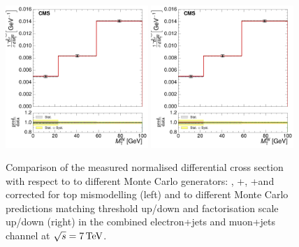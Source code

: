 \begin{figure}[hbtp]
    \centering
     \includegraphics[width=0.48\textwidth]{Chapters/04_Analysis/04b_XSections/images/results/7TeV/MT/central/normalised_xsection_combined_different_generators.pdf}\hfill
     \includegraphics[width=0.48\textwidth]{Chapters/04_Analysis/04b_XSections/images/results/7TeV/MT/central/normalised_xsection_combined_systematics_shifts.pdf}\hfill
     \caption{Comparison of the measured normalised differential cross section with respect to \mt to
     different Monte Carlo generators: \MADGRAPH, \POWHEG+\HERWIG, \POWHEG+\PYTHIA and \MADGRAPH corrected for
     top \pt mismodelling (left) and to different Monte Carlo predictions matching threshold up/down and
     factorisation scale up/down (right) in the combined electron+jets and muon+jets channel at
     $\sqrt{s}=7\,\text{Te\hspace{-.08em}V}$.}
     \label{fig:result_WPT_7TeV_combined}
\end{figure}

